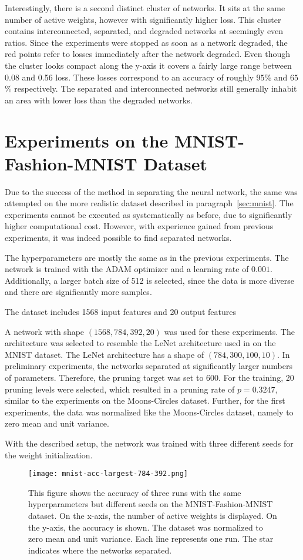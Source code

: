Interestingly, there is a second distinct cluster of networks.
It sits at the same number of active weights, however with significantly higher loss.
This cluster contains interconnected, separated, and degraded networks at seemingly even ratios.
Since the experiments were stopped as soon as a network degraded, the red points refer to losses immediately after the network degraded.
Even though the cluster looks compact along the y-axis it covers a fairly large range between 0.08 and 0.56 loss. These losses correspond to an accuracy of roughly $95$\% and $65$\% respectively.
The separated and interconnected networks still generally inhabit an area with lower loss than the degraded networks.


\section{Experiments on the MNIST-Fashion-MNIST Dataset}
Due to the success of the method in separating the neural network, the same was attempted on the more realistic dataset described in paragraph~\ref{sec:mnist}.
The experiments cannot be executed as systematically as before, due to significantly higher computational cost.
However, with experience gained from previous experiments, it was indeed possible to find separated networks.

The hyperparameters are mostly the same as in the previous experiments.
The network is trained with the ADAM optimizer and a learning rate of $0.001$.
Additionally, a larger batch size of 512 is selected, since the data is more diverse and there are significantly more samples.


The dataset includes 1568 input features and 20 output features

A network with shape $(1568, 784, 392, 20)$ was used for these experiments.
The architecture was selected to resemble the LeNet architecture used in \autocite{LTH} on the MNIST dataset.
The LeNet architecture has a shape of $(784, 300, 100, 10)$.
In preliminary experiments, the networks separated at significantly larger numbers of parameters.
Therefore, the pruning target was set to 600.
For the training, 20 pruning levels were selected, which resulted in a pruning rate of $p=0.3247$, similar to the experiments on the Moons-Circles dataset.
Further, for the first experiments, the data was normalized like the Moons-Circles dataset, namely to zero mean and unit variance.

With the described setup, the network was trained with three different seeds for the weight initialization.
\begin{figure}[ht]
    \centering
    \texttt{[image: mnist-acc-largest-784-392.png]}
    \caption{
        This figure shows the accuracy of three runs with the same hyperparameters but different seeds on the MNIST-Fashion-MNIST dataset.
        On the x-axis, the number of active weights is displayed.
        On the y-axis, the accuracy is shown.
        The dataset was normalized to zero mean and unit variance.
        Each line represents one run.
        The star indicates where the networks separated.
    }\label{fig:mnist-acc}
\end{figure}

